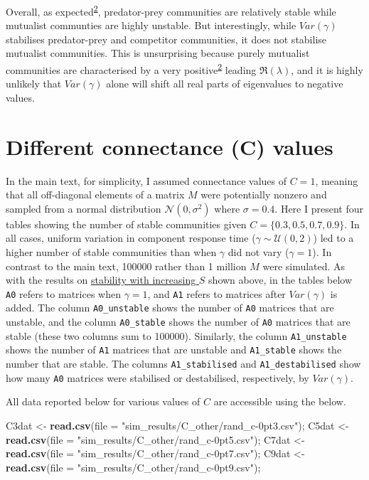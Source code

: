 \documentclass[]{article}
\newenvironment{Shaded}{\begin{snugshade}}{\end{snugshade}}
\newcommand{\KeywordTok}[1]{\textcolor[rgb]{0.13,0.29,0.53}{\textbf{{#1}}}}
\newcommand{\DataTypeTok}[1]{\textcolor[rgb]{0.13,0.29,0.53}{{#1}}}
\newcommand{\StringTok}[1]{\textcolor[rgb]{0.31,0.60,0.02}{{#1}}}
\newcommand{\NormalTok}[1]{{#1}}
\begin{document}
Overall, as
expected\textsuperscript{\protect\hyperlink{ref-Allesina2012}{2}},
predator-prey communities are relatively stable while mutualist
communties are highly unstable. But interestingly, while \(Var(\gamma)\)
stabilises predator-prey and competitor communities, it does not
stabilise mutualist communities. This is unsurprising because purely
mutualist communities are characterised by a very
positive\textsuperscript{\protect\hyperlink{ref-Allesina2012}{2}}
leading \(\Re(\lambda)\), and it is highly unlikely that \(Var(\gamma)\)
alone will shift all real parts of eigenvalues to negative values.

\hypertarget{connectance}{\section{Different connectance (C)
values}\label{connectance}}

In the main text, for simplicity, I assumed connectance values of
\(C = 1\), meaning that all off-diagonal elements of a matrix \(M\) were
potentially nonzero and sampled from a normal distribution
\(\mathcal{N}(0, \sigma^{2})\) where \(\sigma = 0.4\). Here I present
four tables showing the number of stable communities given
\(C = \{0.3, 0. 5, 0.7, 0.9 \}\). In all cases, uniform variation in
component response time (\(\gamma \sim \mathcal{U}(0, 2)\)) led to a
higher number of stable communities than when \(\gamma\) did not vary
(\(\gamma = 1\)). In contrast to the main text, 100000 rather than 1
million \(M\) were simulated. As with the results on
\protect\hyperlink{IncrS}{stability with increasing \(S\)} shown above,
in the tables below \texttt{A0} refers to matrices when \(\gamma = 1\),
and \texttt{A1} refers to matrices after \(Var(\gamma)\) is added. The
column \texttt{A0\_unstable} shows the number of \texttt{A0} matrices
that are unstable, and the column \texttt{A0\_stable} shows the number
of \texttt{A0} matrices that are stable (these two columns sum to
100000). Similarly, the column \texttt{A1\_unstable} shows the number of
\texttt{A1} matrices that are unstable and \texttt{A1\_stable} shows the
number that are stable. The columns \texttt{A1\_stabilised} and
\texttt{A1\_destabilised} show how many \texttt{A0} matrices were
stabilised or destabilised, respectively, by \(Var(\gamma)\).

All data reported below for various values of \(C\) are accessible using
the below.

\begin{Shaded}
\begin{Highlighting}[]
\NormalTok{C3dat <-}\StringTok{ }\KeywordTok{read.csv}\NormalTok{(}\DataTypeTok{file =} \StringTok{"sim_results/C_other/rand_c-0pt3.csv"}\NormalTok{);}
\NormalTok{C5dat <-}\StringTok{ }\KeywordTok{read.csv}\NormalTok{(}\DataTypeTok{file =} \StringTok{"sim_results/C_other/rand_c-0pt5.csv"}\NormalTok{);}
\NormalTok{C7dat <-}\StringTok{ }\KeywordTok{read.csv}\NormalTok{(}\DataTypeTok{file =} \StringTok{"sim_results/C_other/rand_c-0pt7.csv"}\NormalTok{);}
\NormalTok{C9dat <-}\StringTok{ }\KeywordTok{read.csv}\NormalTok{(}\DataTypeTok{file =} \StringTok{"sim_results/C_other/rand_c-0pt9.csv"}\NormalTok{);}
\end{Highlighting}
\end{Shaded}
\end{document}
